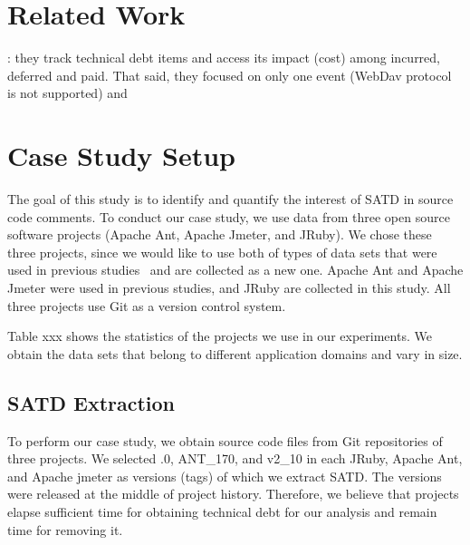 \documentclass[conference]{IEEEtran}
\begin{document}


\cite{Potdar2014ICSME}
\cite{Maldonado2015MTD}


%
\section{Related Work}

\cite{Guo2011ICSM}: they track technical debt items and access its impact (cost) among incurred, deferred and paid. That said, they focused on only one event (WebDav protocol is not supported) and 


\section{Case Study Setup} \label{sec:setup}
The goal of this study is to identify and quantify the interest of SATD in source code comments.
To conduct our case study, we use data from three open source software  projects (Apache Ant, Apache Jmeter, and JRuby). We chose these three projects, since we would like to use both of types of data sets that were used in previous studies~\cite{Maldonado2015MTD,Potdar2014ICSME} and are collected as a new one. Apache Ant and Apache Jmeter were used in previous studies, and JRuby are collected in this study. All three projects use Git as a version control system. 


Table xxx shows the statistics of the projects we use in our experiments. We obtain the data sets that belong to different application domains and vary in size.




\subsection{SATD Extraction}
To perform our case study, we obtain source code files from Git repositories of three projects. We selected {.0}, {\sc ANT\_170}, and {\sc v2\_10} in each JRuby, Apache Ant, and Apache jmeter as versions (tags) of which we extract SATD. The versions were released at the middle of project history. Therefore, we believe that projects elapse sufficient time for obtaining technical debt for our analysis and remain time for removing it.
\end{document}
